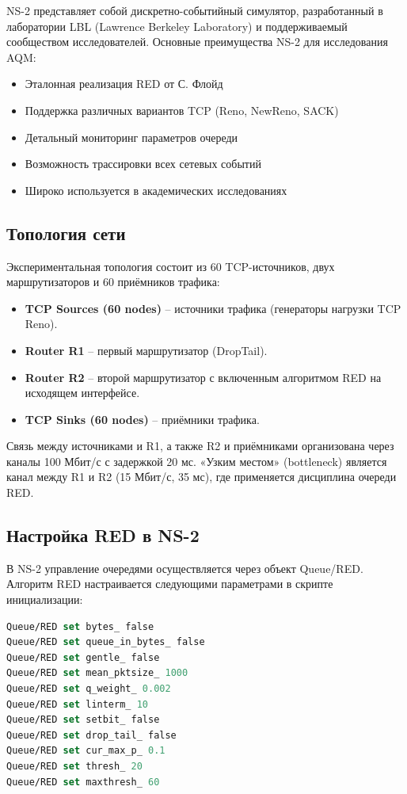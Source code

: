 \documentclass[10pt, conference, twocolumn, a4paper]{article}
\begin{document}
NS-2 представляет собой дискретно-событийный симулятор, разработанный в лаборатории LBL (Lawrence Berkeley Laboratory) и поддерживаемый сообществом исследователей. Основные преимущества NS-2 для исследования AQM:
\begin{itemize}
    \item Эталонная реализация RED от С. Флойд
    \item Поддержка различных вариантов TCP (Reno, NewReno, SACK)
    \item Детальный мониторинг параметров очереди
    \item Возможность трассировки всех сетевых событий
    \item Широко используется в академических исследованиях
\end{itemize}

\subsection{Топология сети}
Экспериментальная топология состоит из 60 TCP-источников, двух маршрутизаторов и 60 приёмников трафика:
\begin{itemize}
    \item \textbf{TCP Sources (60 nodes)} -- источники трафика (генераторы нагрузки TCP Reno).
    \item \textbf{Router R1} -- первый маршрутизатор (DropTail).
    \item \textbf{Router R2} -- второй маршрутизатор с включенным алгоритмом RED на исходящем интерфейсе.
    \item \textbf{TCP Sinks (60 nodes)} -- приёмники трафика.
\end{itemize}

Связь между источниками и R1, а также R2 и приёмниками организована через каналы 100 Мбит/с с задержкой 20 мс. «Узким местом» (bottleneck) является канал между R1 и R2 (15 Мбит/с, 35 мс), где применяется дисциплина очереди RED.

\subsection{Настройка RED в NS-2}
В NS-2 управление очередями осуществляется через объект Queue/RED. Алгоритм RED настраивается следующими параметрами в скрипте инициализации:

\begin{lstlisting}[language=tcl, caption=Настройка RED в NS-2]
Queue/RED set bytes_ false
Queue/RED set queue_in_bytes_ false
Queue/RED set gentle_ false
Queue/RED set mean_pktsize_ 1000
Queue/RED set q_weight_ 0.002
Queue/RED set linterm_ 10
Queue/RED set setbit_ false
Queue/RED set drop_tail_ false
Queue/RED set cur_max_p_ 0.1
Queue/RED set thresh_ 20
Queue/RED set maxthresh_ 60
\end{lstlisting}
\end{document}
